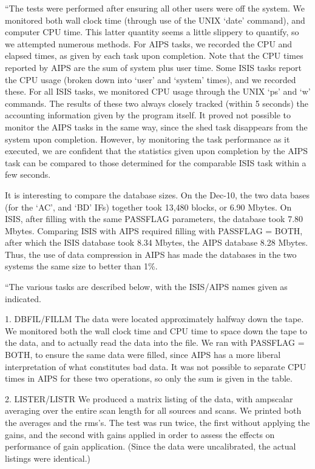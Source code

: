 {	``The tests were performed after ensuring all other users were off the
system.  We monitored both wall clock time (through use of the UNIX `date'
command), and computer CPU time.  This latter quantity seems a little slippery
to quantify, so we attempted numerous methods.  For AIPS tasks, we recorded
the CPU and elapsed times, as given by each task upon completion.
Note that the CPU
times reported by AIPS are the sum of system plus user time.  Some ISIS tasks
report the CPU usage (broken down into `user' and `system' times), and we
recorded these.  For all ISIS tasks, we monitored CPU usage through the
UNIX `ps' and `w' commands.  The results of these two always closely tracked
(within 5 seconds) the accounting information given by the program itself.
It proved not possible to monitor the AIPS tasks in the same way, since the
shed task disappears from the system upon completion.  However, by monitoring
the task performance as it executed, we are confident that the statistics
given upon completion by the AIPS task can be compared to those determined for
the comparable ISIS task within a few seconds.

	It is interesting to compare the database sizes.  On the Dec-10, the
two data bases (for the `AC', and `BD' IFs) together took 13,480 blocks, or
6.90 Mbytes.  On ISIS, after filling with the same PASSFLAG parameters, the
database took 7.80 Mbytes.  Comparing ISIS with AIPS required filling with
PASSFLAG = BOTH, after which the ISIS database took 8.34 Mbytes, the AIPS
database 8.28 Mbytes.  Thus, the use of data compression in AIPS has made the
databases in the two systems the same size to better than 1\%.

``The various tasks are described below, with the ISIS/AIPS names given as
indicated.

\item{1.} DBFIL/FILLM  The data were located approximately halfway down the
tape.  We monitored both the wall clock time and CPU time to space down the
tape to the data, and to actually read the data into the file.  We ran with
PASSFLAG = BOTH, to ensure the same data were filled, since AIPS has a more
liberal interpretation of what constitutes bad data.  It was not possible to
separate CPU times in AIPS for these two operations, so only the sum is given
in the table.

\item{2.} LISTER/LISTR We produced a matrix listing of the data, with
ampscalar averaging over the entire scan length for all sources and scans.
We printed both the averages
and the rms's.  The test was run twice, the first without applying the gains,
and the second with gains applied in order to assess the effects on
performance of gain application.  (Since the data were uncalibrated, the actual
listings were identical.)

}
